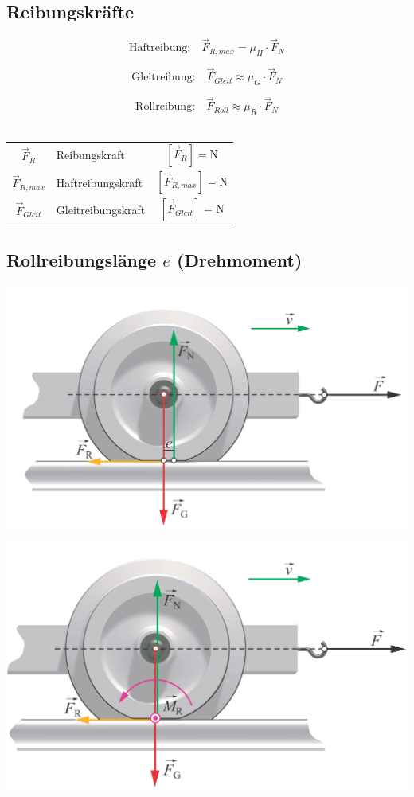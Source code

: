 \vfill\null
\columnbreak	

	\subsection{Reibungskräfte}

		$$ \boxed{ \text{Haftreibung:} \quad  \vec{F}_{R,max} = \mu_H \cdot \vec{F}_N } $$ 
		
		$$ \boxed{ \text{Gleitreibung:} \quad \vec{F}_{Gleit} \approx \mu_G \cdot \vec{F}_N } $$ 
		
		$$ \boxed{ \text{Rollreibung:} \quad \vec{F}_{Roll} \approx \mu_R \cdot \vec{F}_N } $$ \\
		
		\begin{tabular}{c l c}
			$\vec{F}_R$ & Reibungskraft & $[\vec{F}_R] = \mathrm{N}$ \\
			$\vec{F}_{R,max}$ & Haftreibungskraft & $[\vec{F}_{R,max}] = \mathrm{N}$ \\
			$\vec{F}_{Gleit}$ & Gleitreibungskraft & $[\vec{F}_{Gleit}] = \mathrm{N}$ \\
		\end{tabular}

	\subsection{Rollreibungslänge $e$ (Drehmoment)}

		\begin{minipage}{0.48\linewidth}
			\includegraphics[width=0.8\linewidth]{Bilder/rollreibung_1} \\
		\end{minipage}
		\hfill
		\begin{minipage}{0.48\linewidth}
			\includegraphics[width=0.8\linewidth]{Bilder/rollreibung_2} \\
		\end{minipage}
		
